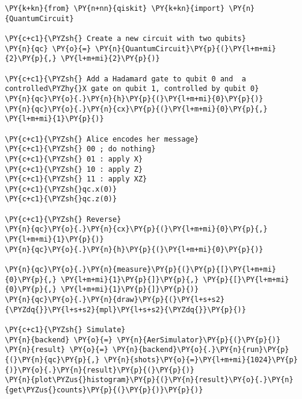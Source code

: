     \begin{tcolorbox}[breakable, size=fbox, boxrule=1pt, pad at break*=1mm,colback=cellbackground, colframe=cellborder]
\begin{Verbatim}[commandchars=\\\{\}]
\PY{k+kn}{from} \PY{n+nn}{qiskit} \PY{k+kn}{import} \PY{n}{QuantumCircuit}

\PY{c+c1}{\PYZsh{} Create a new circuit with two qubits}
\PY{n}{qc} \PY{o}{=} \PY{n}{QuantumCircuit}\PY{p}{(}\PY{l+m+mi}{2}\PY{p}{,} \PY{l+m+mi}{2}\PY{p}{)}

\PY{c+c1}{\PYZsh{} Add a Hadamard gate to qubit 0 and  a controlled\PYZhy{}X gate on qubit 1, controlled by qubit 0}
\PY{n}{qc}\PY{o}{.}\PY{n}{h}\PY{p}{(}\PY{l+m+mi}{0}\PY{p}{)}
\PY{n}{qc}\PY{o}{.}\PY{n}{cx}\PY{p}{(}\PY{l+m+mi}{0}\PY{p}{,} \PY{l+m+mi}{1}\PY{p}{)}

\PY{c+c1}{\PYZsh{} Alice encodes her message}
\PY{c+c1}{\PYZsh{} 00 ; do nothing}
\PY{c+c1}{\PYZsh{} 01 : apply X}
\PY{c+c1}{\PYZsh{} 10 : apply Z}
\PY{c+c1}{\PYZsh{} 11 : apply XZ}
\PY{c+c1}{\PYZsh{}qc.x(0)}
\PY{c+c1}{\PYZsh{}qc.z(0)}

\PY{c+c1}{\PYZsh{} Reverse}
\PY{n}{qc}\PY{o}{.}\PY{n}{cx}\PY{p}{(}\PY{l+m+mi}{0}\PY{p}{,} \PY{l+m+mi}{1}\PY{p}{)}
\PY{n}{qc}\PY{o}{.}\PY{n}{h}\PY{p}{(}\PY{l+m+mi}{0}\PY{p}{)}

\PY{n}{qc}\PY{o}{.}\PY{n}{measure}\PY{p}{(}\PY{p}{[}\PY{l+m+mi}{0}\PY{p}{,} \PY{l+m+mi}{1}\PY{p}{]}\PY{p}{,} \PY{p}{[}\PY{l+m+mi}{0}\PY{p}{,} \PY{l+m+mi}{1}\PY{p}{]}\PY{p}{)}
\PY{n}{qc}\PY{o}{.}\PY{n}{draw}\PY{p}{(}\PY{l+s+s2}{\PYZdq{}}\PY{l+s+s2}{mpl}\PY{l+s+s2}{\PYZdq{}}\PY{p}{)}

\PY{c+c1}{\PYZsh{} Simulate}
\PY{n}{backend} \PY{o}{=} \PY{n}{AerSimulator}\PY{p}{(}\PY{p}{)}
\PY{n}{result} \PY{o}{=} \PY{n}{backend}\PY{o}{.}\PY{n}{run}\PY{p}{(}\PY{n}{qc}\PY{p}{,} \PY{n}{shots}\PY{o}{=}\PY{l+m+mi}{1024}\PY{p}{)}\PY{o}{.}\PY{n}{result}\PY{p}{(}\PY{p}{)}
\PY{n}{plot\PYZus{}histogram}\PY{p}{(}\PY{n}{result}\PY{o}{.}\PY{n}{get\PYZus{}counts}\PY{p}{(}\PY{p}{)}\PY{p}{)}
\end{Verbatim}
\end{tcolorbox}
 
            
    
    \begin{center}
    \end{center}
    { \hspace*{\fill} \\}
    


